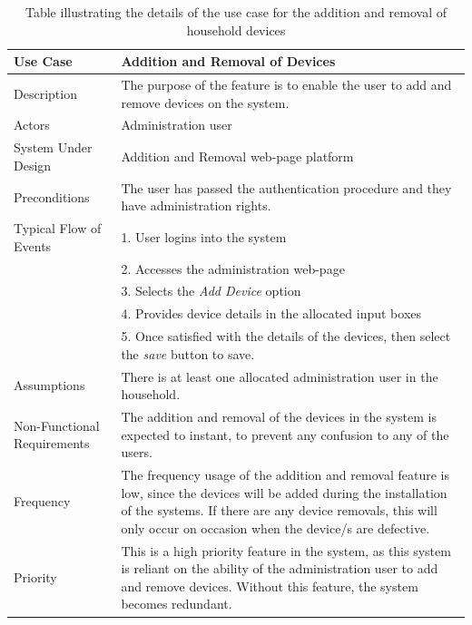 \documentclass[10pt,twocolumn]{witseiepaper}
\begin{document}
	\begin{table}[H]
		\centering
		\caption{Table illustrating the details of the use case for the addition and removal of household devices}
		\label{addition_removal_use_case}
		\begin{tabular}{| p{22mm} | p{50mm} |}
			\hline
			\textbf{Use Case} & \textbf{Addition and Removal of Devices}\\
			\hline
			Description & The purpose of the feature is to enable the user to add and remove devices on the system. \\
			\hline
			Actors & Administration user \\
			\hline
			System Under Design & Addition and Removal web-page platform \\
			\hline
			Preconditions & The user has passed the authentication procedure and they have administration rights. \\
			\hline
			Typical Flow of Events & 1. User logins into the system\\
			& 2. Accesses the administration web-page \\
			& 3. Selects the \textit{Add Device} option \\
			& 4. Provides device details in the allocated input boxes \\
			& 5. Once satisfied with the details of the devices, then select the \textit{save} button to save. \\
			\hline
			Assumptions & There is at least one allocated administration user in the household.\\
			\hline
			Non-Functional Requirements & The addition and removal of the devices in the system is expected to instant, to prevent any confusion to any of the users.\\
			\hline
			Frequency & The frequency usage of the addition and removal feature is low, since the devices will be added during the installation of the systems. If there are any device removals, this will only occur on occasion when the device/s are defective.\\
			\hline
			Priority & This is a high priority feature in the system, as this system is reliant on the ability of the administration user to add and remove devices. Without this feature, the system becomes redundant.\\
			\hline
		\end{tabular}
	\end{table}
\end{document}
